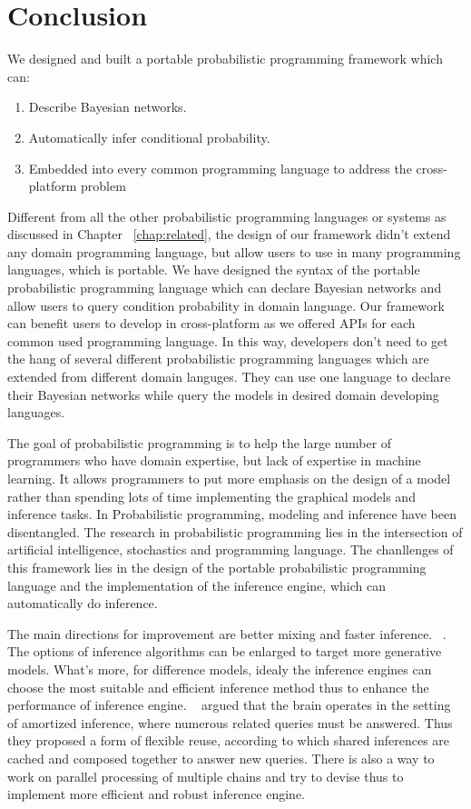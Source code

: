 \chapter{Conclusion}
\label{chap:conclusion}
We designed and built a portable probabilistic programming framework which can:
\begin{enumerate}
  \item Describe Bayesian networks. 
  \item Automatically infer conditional probability.
  \item Embedded into every common programming language to address the cross-platform problem
\end{enumerate}
Different from all the other probabilistic programming languages or systems as discussed in Chapter ~\ref{chap:related}, the design of our framework didn't extend any domain programming language, but allow users to use in many programming languages, which is portable. We have designed the syntax of the portable probabilistic programming language which can declare Bayesian networks and allow users to query condition probability in domain language. Our framework can benefit users to develop in cross-platform as we offered APIs for each common used programming language. In this way, developers don't need to get the hang of several different probabilistic programming languages which are extended from different domain languges. They can use one language to declare their Bayesian networks while query the models in desired domain developing languages.

The goal of probabilistic programming is to help the large number of programmers who have domain expertise, but lack of expertise in machine learning. It allows programmers to put more emphasis on the design of a model rather than spending lots of time implementing the graphical models and inference tasks. In Probabilistic programming, modeling and inference have been disentangled. The research in probabilistic programming lies in the intersection of artificial intelligence, stochastics and programming language. The chanllenges of this framework lies in the design of the portable probabilistic programming language and the implementation of the inference engine, which can automatically do inference.

The main directions for improvement are better mixing and faster inference. ~\cite{goodman}. The options of inference algorithms can be enlarged to target more generative models. What's more, for difference models, idealy the inference engines can choose the most suitable and efficient inference method thus to enhance the performance of inference engine. ~\cite{amortized} argued that the brain operates in the setting of amortized inference, where numerous related queries must be answered. Thus they proposed a form of ﬂexible reuse, according to which shared inferences are cached and composed together to answer new queries. There is also a way to work on parallel processing of multiple chains and try to devise thus to implement more efficient and robust inference engine.
